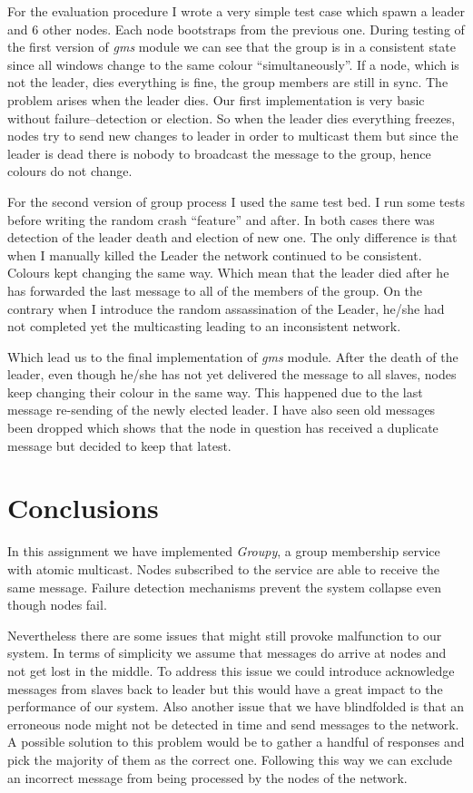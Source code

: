 \documentclass[a4paper, 11pt]{article}
\begin{document}
For the evaluation procedure I wrote a very simple test case which spawn a
leader and 6 other nodes. Each node bootstraps from the previous one. During
testing of the first version of \emph{gms} module we can see that the group is
in a consistent state since all windows change to the same colour
``simultaneously''. If a node, which is not the leader, dies everything is fine,
the group members are still in sync. The problem arises when the leader dies.
Our first implementation is very basic without failure--detection or election.
So when the leader dies everything freezes, nodes try to send new changes to
leader in order to multicast them but since the leader is dead there is nobody
to broadcast the message to the group, hence colours do not change.

For the second version of group process I used the same test bed. I run some
tests before writing the random crash ``feature'' and after. In both cases
there was detection of the leader death and election of new one. The only
difference is that when I manually killed the Leader the network continued to be
consistent. Colours kept changing the same way. Which mean that the leader died
after he has forwarded the last message to all of the members of the group. On
the contrary when I introduce the random assassination of the Leader, he/she
had not completed yet the multicasting leading to an inconsistent network.

Which lead us to the final implementation of \emph{gms} module. After the death
of the leader, even though he/she has not yet delivered the message to all
slaves, nodes keep changing their colour in the same way. This happened due to
the last message re-sending of the newly elected leader. I have also seen old
messages been dropped which shows that the node in question has received a
duplicate message but decided to keep that latest.

\section{Conclusions}

In this assignment we have implemented \emph{Groupy}, a group membership service
with atomic multicast. Nodes subscribed to the service are able to receive the
same message. Failure detection mechanisms prevent the system collapse even
though nodes fail.

Nevertheless there are some issues that might
still provoke malfunction to our system. In terms of simplicity we assume that
messages do arrive at nodes and not get lost in the middle. To address this
issue we could introduce acknowledge messages from slaves back to leader but
this would have a great impact to the performance of our system. Also another
issue that we have blindfolded is that an erroneous node might not be detected
in time and send messages to the network. A possible solution to this problem
would be to gather a handful of responses and pick the majority of them as the
correct one. Following this way we can exclude an incorrect message from being
processed by the nodes of the network.
\end{document}

